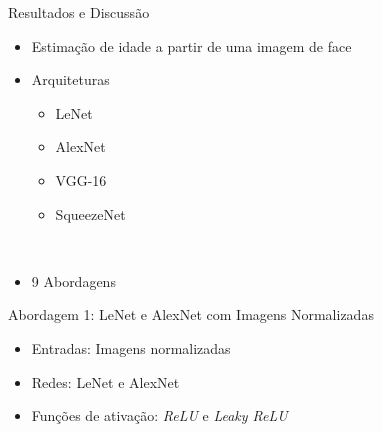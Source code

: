 
\begin{frame}{Resultados e Discussão}
 \begin{itemize}
   \item Estimação de idade a partir de uma imagem de face
   \ \ \newline
    \item Arquiteturas
    \begin{itemize}
      \item LeNet
      \item AlexNet
      \item VGG-16
      \item SqueezeNet
    \end{itemize}
   \ \ \newline
   \item \alert{9 Abordagens}
   \end{itemize}
\end{frame}


\begin{frame}{Abordagem 1: LeNet e AlexNet com Imagens Normalizadas}
 \begin{itemize}
   \item Entradas: Imagens normalizadas
   \item Redes: LeNet e AlexNet
   \item Funções de ativação: \emph{ReLU} e \emph{Leaky ReLU}
   \end{itemize}
\end{frame}

